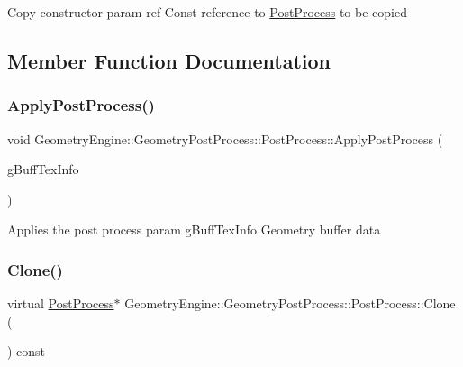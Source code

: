 Copy constructor param ref Const reference to \mbox{\hyperlink{class_geometry_engine_1_1_geometry_post_process_1_1_post_process}{Post\+Process}} to be copied 

\subsection{Member Function Documentation}
\mbox{\label{class_geometry_engine_1_1_geometry_post_process_1_1_post_process_a2dbb157265ebdeea658982673e757d46}} 
\subsubsection{\texorpdfstring{ApplyPostProcess()}{ApplyPostProcess()}}
{\footnotesize\ttfamily void Geometry\+Engine\+::\+Geometry\+Post\+Process\+::\+Post\+Process\+::\+Apply\+Post\+Process (\begin{DoxyParamCaption}\item[{const \mbox{\hyperlink{struct_geometry_engine_1_1_g_buffer_texture_info}{G\+Buffer\+Texture\+Info}} \&}]{g\+Buff\+Tex\+Info }\end{DoxyParamCaption})}

Applies the post process param g\+Buff\+Tex\+Info Geometry buffer data \mbox{\label{class_geometry_engine_1_1_geometry_post_process_1_1_post_process_aa80749cf09041335f6b3bda3aaf31711}} 
\subsubsection{\texorpdfstring{Clone()}{Clone()}}
{\footnotesize\ttfamily virtual \mbox{\hyperlink{class_geometry_engine_1_1_geometry_post_process_1_1_post_process}{Post\+Process}}$\ast$ Geometry\+Engine\+::\+Geometry\+Post\+Process\+::\+Post\+Process\+::\+Clone (\begin{DoxyParamCaption}{ }\end{DoxyParamCaption}) const\hspace{0.3cm}{\ttfamily [pure virtual]}}

